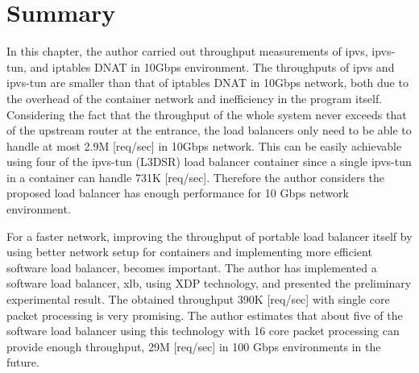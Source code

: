 \FloatBarrier

\section{Summary}

In this chapter, the author carried out throughput measurements of ipvs, ipvs-tun, and iptables DNAT in 10Gbps environment.
The throughputs of ipvs and ipvs-tun are smaller than that of iptables DNAT in 10Gbps network, both due to the overhead of the container network and inefficiency in the program itself.
Considering the fact that the throughput of the whole system never exceeds that of the upstream router at the entrance, the load balancers only need to be able to handle at most 2.9M [req/sec] in 10Gbps network.
This can be easily achievable using four of the ipvs-tun (L3DSR) load balancer container since a single ipvs-tun in a container can handle 731K [req/sec].
Therefore the author considers the proposed load balancer has enough performance for 10 Gbps network environment.

For a faster network, improving the throughput of portable load balancer itself by using better network setup for containers and implementing more efficient software load balancer, becomes important.
The author has implemented a software load balancer, xlb, using XDP technology, and presented the preliminary experimental result.
The obtained throughput 390K [req/sec] with single core packet processing is very promising.
The author estimates that about five of the software load balancer using this technology with 16 core packet processing can provide enough throughput, 29M [req/sec] in 100 Gbps environments in the future. 


